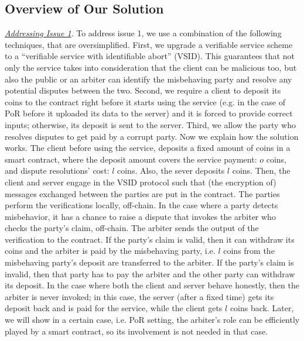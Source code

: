
\subsection{Overview of Our Solution}\label{sec::Overview-of-Our-Solution}

\noindent\underline{\textit{Addressing Issue 1}}. To address issue 1, we use a combination of the following techniques, that are oversimplified.  First, we upgrade a verifiable service scheme to a ``verifiable service with identifiable abort'' (VSID). This guarantees that not only the service  takes into  consideration that the client can  be malicious too, but also the public or an arbiter can identify the misbehaving party and resolve any potential disputes between the two. Second, we require a client to deposit its coins to the contract right before it starts using the service (e.g. in the case of PoR before it uploaded its data to the server) and it is forced to provide correct inputs; otherwise, its deposit is sent to the server.  Third, we allow the party who resolves disputes to get paid by a corrupt party. Now we explain how the solution works. The client before using the service, deposits  a fixed amount of coins in a smart contract, where the deposit amount covers the service payment: $o$ coins, and dispute resolutions' cost: $l$ coins. Also, the sever deposits  $l$ coins. Then, the client and server  engage in the   VSID protocol such that (the encryption of)  messages exchanged between the parties are put in the contract.  The parties perform the verifications locally, off-chain.  In the case where a party detects misbehavior, it  has a chance to raise a dispute that invokes the arbiter who  checks the party's claim, off-chain. The arbiter sends the output of the verification to the contract. If the party's claim is  valid, then it can withdraw its coins and the arbiter is paid by the misbehaving party, i.e. $l$ coins from the misbehaving party's deposit are transferred to the arbiter.  If the party's claim is invalid, then that party has to pay the arbiter and the other party can withdraw its deposit. In the case where both the client and server behave honestly, then the arbiter is never invoked;  in this case, the server (after a fixed time) gets its deposit back and is paid for the service, while  the client gets $l$ coins back.  Later, we will show in a certain case, i.e. PoR setting, the arbiter's role can be efficiently played by a smart contract, so its involvement is not needed in that case. 

